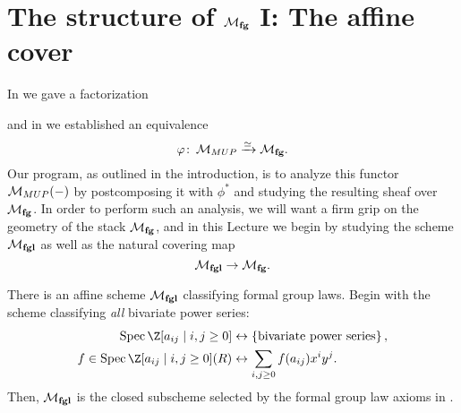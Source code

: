 \section{The structure of \texorpdfstring{$\mathcal{M}_{\mathbf{fg}}$}{Mfg} I: The affine cover}\label{MfgI:AffineCover}

In  we gave a factorization
\begin{center}
\end{center}
and in  we established an equivalence \[\varphi\colon\thinspace \mathcal{M}_{MUP} \xrightarrow{\simeq} \mathcal{M}_{\mathbf{fg}}.\]  Our program, as outlined in the introduction, is to analyze this functor $\mathcal{M}_{MUP}(-)$ by postcomposing it with $\phi^*$ and studying the resulting sheaf over $\mathcal{M}_{\mathbf{fg}}$.  In order to perform such an analysis, we will want a firm grip on the geometry of the stack $\mathcal{M}_{\mathbf{fg}}$, and in this Lecture we begin by studying the scheme $\mathcal{M}_{\mathbf{fgl}}$ as well as the natural covering map \[\mathcal{M}_{\mathbf{fgl}} \to \mathcal{M}_{\mathbf{fg}}.\]

\begin{definition}
There is an affine scheme $\mathcal{M}_{\mathbf{fgl}}$ classifying formal group laws.  Begin with the scheme classifying \emph{all} bivariate power series:
\begin{align*}
\Spec \Z[a_{ij} \mid i, j \ge 0] & \leftrightarrow \left\{ \text{bivariate power series} \right\}, \\
f \in \Spec\Z[a_{ij} \mid i, j \ge 0](R) & \leftrightarrow \sum_{i, j \ge 0} f(a_{ij}) x^i y^j.
\end{align*}
Then, $\mathcal{M}_{\mathbf{fgl}}$ is the closed subscheme selected by the formal group law axioms in .
\end{definition}

